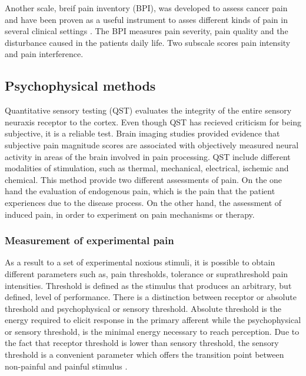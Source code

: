 Another scale, breif pain inventory (BPI), was developed to assess cancer pain and have been proven as a useful instrument to asses different kinds of pain in several clinical settings \cite{libro pain}. The BPI measures pain severity, pain quality and the disturbance caused in the patients daily life. Two subscale scores pain intensity and pain interference.  

\subsection{Psychophysical methods}
Quantitative sensory testing (QST) evaluates the integrity of the entire sensory neuraxis receptor to the cortex. Even though QST has recieved criticism for being subjective, it is a reliable test. Brain imaging studies provided evidence that subjective pain magnitude scores are associated with objectively measured neural activity in areas of the brain involved in pain processing. QST include different modalities of stimulation, such as thermal, mechanical, electrical, ischemic and chemical. This method provide two different assessments of pain. On the one hand the  evaluation of endogenous pain, which is the pain that the patient experiences due to the disease process. On the other hand, the assessment of induced pain, in order to experiment on pain mechanisms or therapy. \cite{neurop_exam}


\subsubsection{Measurement of experimental pain}
As a result to a set of experimental noxious stimuli, it is possible to obtain different parameters such as, pain thresholds, tolerance or suprathreshold pain intensities. Threshold is defined as the stimulus that produces an arbitrary, but defined, level of performance. There is a distinction between receptor or absolute threshold and psychophysical or sensory threshold. Absolute threshold is the energy required to elicit response in the primary afferent while the psychophysical or sensory threshold, is the minimal energy necessary to reach perception. Due to the fact that receptor threshold is lower than sensory threshold, the sensory threshold is a convenient parameter which offers the transition point between non-painful and painful stimulus \cite{neurop_exam}.

